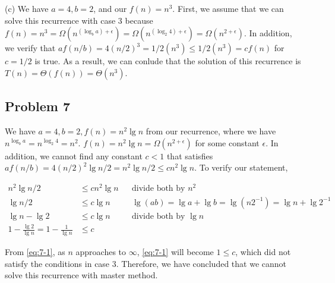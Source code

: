 \documentclass[a4paper]{article}
\makeatletter
\newenvironment{solution}
  {\begin{proof}[Solution]}
  {\end{proof}}
\renewenvironment{proof}[1][\proofname]{%
  \par\pushQED{\qed}\normalfont%
  \topsep6\p@\@plus6\p@\relax
  \trivlist\item[\hskip\labelsep\bfseries#1\@addpunct{.}]%
  \ignorespaces
}{%
  \popQED\endtrivlist\@endpefalse
}
\makeatother
\begin{document}
\begin{solution}
  (c) We have $a = 4, b = 2$, and our $f(n) = n^3$. First, we assume that we can solve this recurrence with case 3 because $f(n) = n^3 = \Omega(n^{(\log_{b}a) + \epsilon}) = \Omega(n^{(\log_{2}4) + \epsilon}) = \Omega(n^{2 + \epsilon})$. In addition, we verify that $af(n/b) = 4(n/2)^3 = 1/2(n^3) \le 1/2(n^3) = cf(n)$ for $c = 1/2$ is true. As a result, we can conlude that the solution of this recurrence is $T(n) = \Theta(f(n)) = \Theta(n^3)$.
\end{solution}

\subsection*{Problem 7}

\begin{solution}
  We have $a = 4, b = 2, f(n) = n^2\lg n$ from our recurrence, where we have $n^{\log_{b}a} = n^{\log_{2}4} = n^2$. $f(n) = n^2\lg n= \Omega({n^{2 + \epsilon}})$ for some constant $\epsilon$. In addition, we cannot find any constant $c < 1$ that satisfies $af(n/b) = 4(n/2)^2\lg n/2  = n^2\lg n/2 \le cn^2 \lg n$. To verify our statement,

  \begin{align}
    n^2\lg n/2 &\le cn^2 \lg n && \text{divide both by $n^2$}\nonumber\\
    \lg n/2 &\le c\lg n && \lg(ab) = \lg a + \lg b = \lg(n2^{-1}) = \lg n + \lg2^{-1}\nonumber\\
    \lg n - \lg 2 &\le c\lg n && \text{divide both by $\lg n$}\nonumber\\
    1 - \frac{\lg 2}{\lg n} = 1 - \frac{1}{\lg n}&\le c \label{eq:7-1}
  \end{align}

  From \eqref{eq:7-1}, as $n$ approaches to $\infty$, \eqref{eq:7-1} will become $1 \le c$, which did not satisfy the conditions in case 3. Therefore, we have concluded that we cannot solve this recurrence with master method.
\end{solution}
\setcounter{equation}{0}
\end{document}
